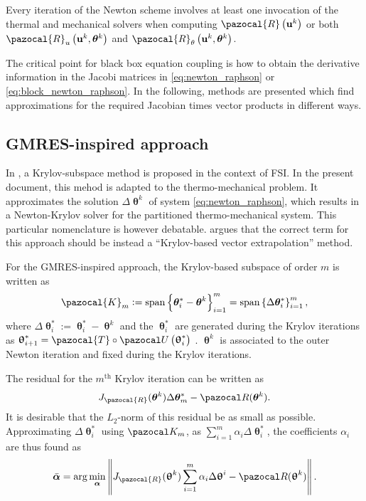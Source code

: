 Every iteration of the Newton scheme involves at least one invocation of the thermal and mechanical solvers when computing $\pazocal{R}\left(\mathbf{u}^{k}\right)$ or both $\pazocal{R}_{u}\left(\mathbf{u}^{k}, \boldsymbol{\theta}^{k}\right)$ and $\pazocal{R}_{\theta}\left(\mathbf{u}^{k}, \boldsymbol{\theta}^{k}\right)$.

The critical point for black box equation coupling is how to obtain the derivative information in the Jacobi matrices in \eqref{eq:newton_raphson} or \eqref{eq:block_newton_raphson}.
In the following, methods are presented which find approximations for the required Jacobian times vector products in different ways.

\subsection{GMRES-inspired approach}

In \cite{michler_interface_2005}, a Krylov-subspace method is proposed in the context of FSI.
In the present document, this mehod is adapted to the thermo-mechanical problem.
It approximates the solution $\Delta \bm{\uptheta}^{k}$ of system \eqref{eq:newton_raphson}, which results in a Newton-Krylov solver for the partitioned thermo-mechanical system.
This particular nomenclature is however debatable.
\cite{kuttler_vector_2009} argues that the correct term for this approach should be instead a “Krylov-based vector extrapolation” method. 


For the GMRES-inspired approach, the Krylov-based subspace of order $m$ is written as
\begin{equation}
\pazocal{K}_{m}:=\operatorname{span}\left\{\boldsymbol{\theta}^{*}_i-\boldsymbol{\theta}^{k}\right\}_{i=1}^{m}=\operatorname{span}\left\{\Delta \boldsymbol{\theta}^*_{i}\right\}_{i=1}^{m},
\end{equation}
where $\Delta \bm{\uptheta}^*_{i}:=\bm{\uptheta}^*_{i}-\bm{\uptheta}^{k}$ and the $\bm{\uptheta}^*_{i}$ are generated during the Krylov iterations as $\bm{\uptheta}^*_{i+1}=\pazocal{T} \circ \pazocal U\left(\bm{\uptheta}^*_{i}\right)$ . $\bm{\uptheta}^{k}$ is associated to the outer Newton iteration and fixed during the Krylov iterations.

The residual for the $m^\mathrm{th}$ Krylov iteration can be written as
\begin{equation}
J_\pazocal{R}(\boldsymbol \theta^k)\Delta\boldsymbol \theta^*_m - \pazocal R(\boldsymbol \theta^k).
\end{equation}
It is desirable that the $L_2$-norm of this residual be as small as possible.
Approximating $\Delta \bm \uptheta^*_i$ using $\pazocal K_m$, as $\sum_{i=1}^m \alpha_i \Delta \bm \uptheta^*_i$, the coefficients $\alpha_i$ are thus found as
\begin{equation} \label{eq:gmres_1st_ls}
\bar{\boldsymbol \alpha} = \arg\min_{\boldsymbol\alpha} \left\|J_\pazocal{R}(\bm \uptheta^k)\sum_{i=1}^m \alpha_i \Delta\bm \uptheta^i - \pazocal R(\bm \uptheta^k)\right\|.
\end{equation}

